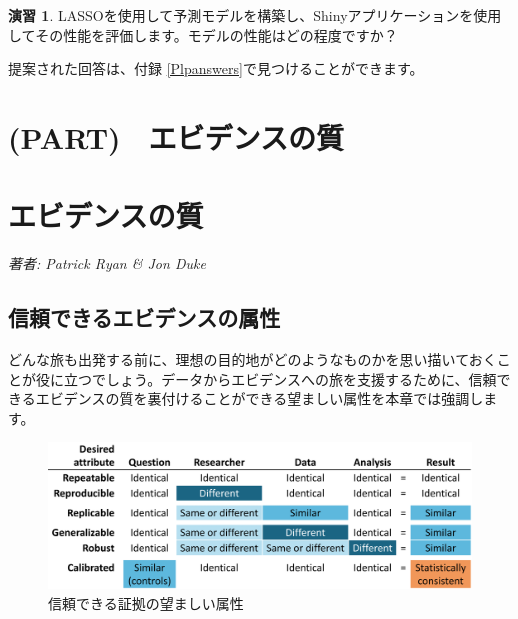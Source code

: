 \documentclass[
  11pt]{book}
\theoremstyle{definition}
\theoremstyle{definition}
\theoremstyle{definition}
\newtheorem{exercise}{演習}[chapter]
\theoremstyle{definition}
\theoremstyle{remark}
\begin{document}
\begin{exercise}
\protect\hypertarget{exr:exercisePlp3}{}\label{exr:exercisePlp3}LASSOを使用して予測モデルを構築し、Shinyアプリケーションを使用してその性能を評価します。モデルの性能はどの程度ですか？
\end{exercise}

提案された回答は、付録 \ref{Plpanswers}で見つけることができます。

\chapter*{(PART)　エビデンスの質}\label{part-ux30a8ux30d3ux30c7ux30f3ux30b9ux306eux8cea}

\chapter{エビデンスの質}\label{EvidenceQuality}

\emph{著者: Patrick Ryan \& Jon Duke}


\section{信頼できるエビデンスの属性}\label{ux4fe1ux983cux3067ux304dux308bux30a8ux30d3ux30c7ux30f3ux30b9ux306eux5c5eux6027}

どんな旅も出発する前に、理想の目的地がどのようなものかを思い描いておくことが役に立つでしょう。データからエビデンスへの旅を支援するために、信頼できるエビデンスの質を裏付けることができる望ましい属性を本章では強調します。

\begin{figure}

{\centering \includegraphics[width=1\linewidth]{images/EvidenceQuality/reliableevidenceattributes} 

}

\caption{信頼できる証拠の望ましい属性}\label{fig:attributesOfEvidence}
\end{figure}
\end{document}
